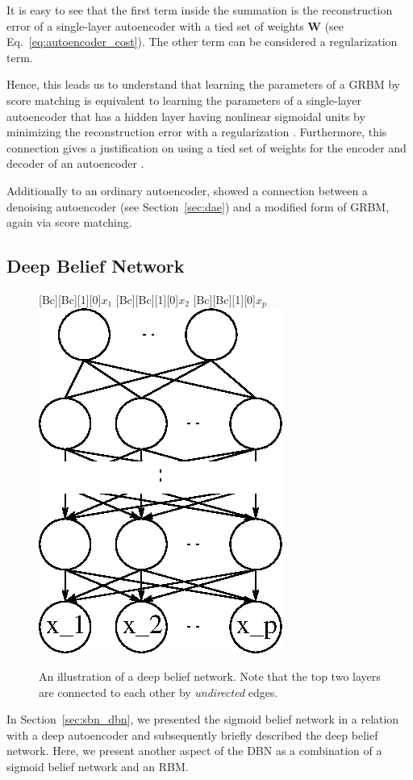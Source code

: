 \documentclass[dissertation,nocontribution,draft*]{aaltoseries}
\newcommand{\matr}[1]{\mathbf{#1}}
\newcommand{\mW}[0]{\matr{W}}
\begin{document}
It is easy to see that the first term inside the summation
is the reconstruction error of a single-layer autoencoder
with a tied set of weights $\mW$ (see
Eq.~\eqref{eq:autoencoder_cost}). The other term can be
considered a regularization term.

Hence, this leads us to understand that learning the
parameters of a GRBM by score matching is equivalent to
learning the parameters of a single-layer autoencoder that
has a hidden layer having nonlinear sigmoidal units by
minimizing the reconstruction error with a regularization
\citep{Swersky2011}. Furthermore, this connection gives a
justification on using a tied set of weights for the
encoder and decoder of an autoencoder \citep{Vincent2011}.

Additionally to an ordinary autoencoder, \citet{Vincent2011}
showed a connection between a denoising autoencoder (see
Section~\ref{sec:dae}) and a modified form of GRBM, again
via score matching. 


\clearpage
\subsection{Deep Belief Network}
\label{sec:dbn}

\begin{figure}
    \centering
    [Bc][Bc][1][0]{$x_1$}
    [Bc][Bc][1][0]{$x_2$}
    [Bc][Bc][1][0]{$x_p$}
    \includegraphics[width=0.27\columnwidth]{figures/dbn.eps}
    \caption{An illustration of a deep belief network. Note
    that the top two layers are connected to each other by
    \textit{undirected} edges.}
    \label{fig:dbn}
    \vspace{-2mm}
\end{figure}

In Section~\ref{sec:sbn_dbn}, we presented the sigmoid
belief network in a relation with a deep autoencoder and
subsequently briefly described the deep belief network.
Here, we present another aspect of the DBN as a combination of
a sigmoid belief network and an RBM.
\end{document}
